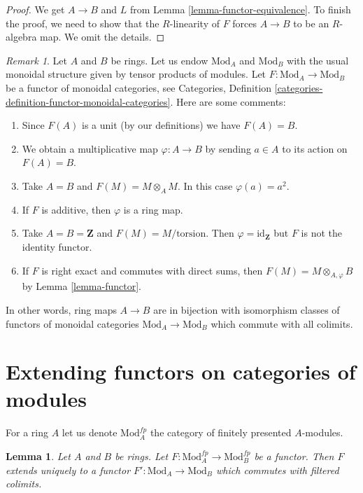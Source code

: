 \documentclass{stacks-project}
\theoremstyle{plain}
\newtheorem{lemma}[subsection]{Lemma}
\theoremstyle{definition}
\theoremstyle{remark}
\newtheorem{remark}[subsection]{Remark}
\numberwithin{equation}{subsection}
\begin{document}
\begin{proof}
We get $A \to B$ and $L$ from Lemma \ref{lemma-functor-equivalence}.
To finish the proof, we need to show that the $R$-linearity
of $F$ forces $A \to B$ to be an $R$-algebra map. We omit the details.
\end{proof}

\begin{remark}
\label{remark-monoidal}
Let $A$ and $B$ be rings. Let us endow $\text{Mod}_A$ and $\text{Mod}_B$
with the usual monoidal structure given by tensor products of modules.
Let $F : \text{Mod}_A \to \text{Mod}_B$ be a functor of
monoidal categories, see
Categories, Definition \ref{categories-definition-functor-monoidal-categories}.
Here are some comments:
\begin{enumerate}
\item Since $F(A)$ is a unit (by our definitions) we have $F(A) = B$.
\item We obtain a multiplicative map $\varphi : A \to B$
by sending $a \in A$ to its action on $F(A) = B$.
\item Take $A = B$ and $F(M) = M \otimes_A M$. In this case $\varphi(a) = a^2$.
\item If $F$ is additive, then $\varphi$ is a ring map.
\item Take $A = B = \mathbf{Z}$ and $F(M) = M/\text{torsion}$. Then
$\varphi = \text{id}_\mathbf{Z}$ but $F$ is not the identity functor.
\item If $F$ is right exact and commutes with direct sums,
then $F(M) = M \otimes_{A, \varphi} B$ by Lemma \ref{lemma-functor}.
\end{enumerate}
In other words, ring maps $A \to B$ are in bijection with isomorphism classes
of functors of monoidal categories $\text{Mod}_A \to \text{Mod}_B$
which commute with all colimits.
\end{remark}




\section{Extending functors on categories of modules}
\label{section-functors-extend}

\noindent
For a ring $A$ let us denote $\text{Mod}^{fp}_A$ the category of
finitely presented $A$-modules.

\begin{lemma}
\label{lemma-functor-fp-modules}
Let $A$ and $B$ be rings. Let
$F : \text{Mod}^{fp}_A \to \text{Mod}^{fp}_B$ be a functor.
Then $F$ extends uniquely to a functor
$F' : \text{Mod}_A \to \text{Mod}_B$
which commutes with filtered colimits.
\end{lemma}
\end{document}

